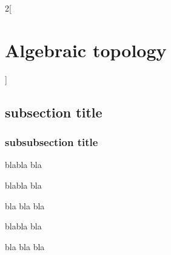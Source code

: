 \documentclass[../../../main.tex]{subfiles}
\begin{document}
\renewcommand{\col}{\geo}
\begin{multicols}{2}[\section{Algebraic topology}]
  \subsection{subsection title}
  \subsubsection{subsubsection title}
  \begin{definition}
    blabla bla
  \end{definition}
  \begin{theorem}
    blabla bla
  \end{theorem}
  \begin{lemma}
    bla bla bla
  \end{lemma}
  \begin{proposition}
    blabla bla
  \end{proposition}
  \begin{corollary}
    bla bla bla
  \end{corollary}
\end{multicols}
\end{document}
